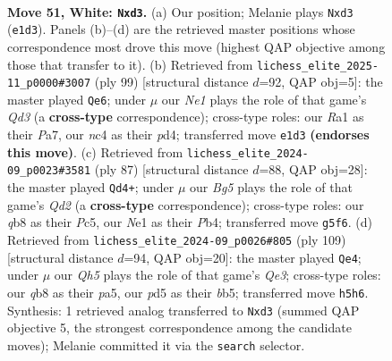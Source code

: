 \documentclass[11pt]{article}
\begin{document}
\clearpage

\begin{figure}[p]\centering
\begin{subfigure}{0.46\textwidth}\centering
\resizebox{\linewidth}{!}{%
\newchessgame
\chessboard[
  setfen={1qb5/r2k4/4p3/p2pPpBQ/P1n4P/3p4/2R5/RN2N1K1 w - - 3 51},
  showmover=false,
  pgfstyle=straightmove, color=movearrow, markmove={e1-d3}
]}
\caption{}
\end{subfigure}\hfill
\begin{subfigure}{0.46\textwidth}\centering
\resizebox{\linewidth}{!}{%
\newchessgame
\chessboard[
  setfen={6k1/p4p2/3q4/3r2pP/P2Pp1P1/2PnB2K/4R3/5Q2 b - - 5 50},
  showmover=false,
  pgfstyle=straightmove, color=movearrow, markmove={d6-e6}
]}
\caption{}
\end{subfigure}
\\[4pt]
\begin{subfigure}{0.46\textwidth}\centering
\resizebox{\linewidth}{!}{%
\newchessgame
\chessboard[
  setfen={3r2k1/3q1p2/8/2p1PP2/1pb1N1P1/2n4P/2Q3B1/4R1K1 b - - 2 44},
  showmover=false,
  pgfstyle=straightmove, color=movearrow, markmove={d7-d4}
]}
\caption{}
\end{subfigure}\hfill
\begin{subfigure}{0.46\textwidth}\centering
\resizebox{\linewidth}{!}{%
\newchessgame
\chessboard[
  setfen={8/6k1/4q3/PBp2b2/1PP2Pp1/3pr1P1/3Q2R1/5K2 b - - 4 55},
  showmover=false,
  pgfstyle=straightmove, color=movearrow, markmove={e6-e4}
]}
\caption{}
\end{subfigure}
\caption{\textbf{Move 51, White: \texttt{Nxd3}.} (a) Our position; Melanie plays \texttt{Nxd3} (\texttt{e1d3}). Panels (b)--(d) are the retrieved master positions whose correspondence most drove this move (highest QAP objective among those that transfer to it). (b) Retrieved from \texttt{lichess\_elite\_2025-11\_p0000\#3007} (ply 99) [structural distance $d$=92, QAP obj=5]: the master played \texttt{Qe6}; under $\mu$ our \emph{Ne1} plays the role of that game's \emph{Qd3} (a \textbf{cross-type} correspondence); cross-type roles: our \emph{R}a1 as their \emph{P}a7, our \emph{n}c4 as their \emph{p}d4; transferred move \texttt{e1d3} \textbf{(endorses this move)}. (c) Retrieved from \texttt{lichess\_elite\_2024-09\_p0023\#3581} (ply 87) [structural distance $d$=88, QAP obj=28]: the master played \texttt{Qd4+}; under $\mu$ our \emph{Bg5} plays the role of that game's \emph{Qd2} (a \textbf{cross-type} correspondence); cross-type roles: our \emph{q}b8 as their \emph{P}c5, our \emph{N}e1 as their \emph{P}b4; transferred move \texttt{g5f6}. (d) Retrieved from \texttt{lichess\_elite\_2024-09\_p0026\#805} (ply 109) [structural distance $d$=94, QAP obj=20]: the master played \texttt{Qe4}; under $\mu$ our \emph{Qh5} plays the role of that game's \emph{Qe3}; cross-type roles: our \emph{q}b8 as their \emph{p}a5, our \emph{p}d5 as their \emph{b}b5; transferred move \texttt{h5h6}. Synthesis: 1 retrieved analog transferred to \texttt{Nxd3} (summed QAP objective 5, the strongest correspondence among the candidate moves); Melanie committed it via the \texttt{search} selector.}
\label{fig:thought-m100}
\end{figure}
\end{document}
